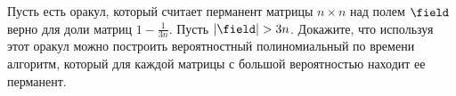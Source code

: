 Пусть есть оракул, который считает перманент матрицы $n \times n$ над полем $\field$ верно для доли
матриц $1 - \frac{1}{3n}$. Пусть $|\field| > 3n$. Докажите, что используя этот оракул можно построить
вероятностный полиномиальный по времени алгоритм, который для каждой матрицы с большой вероятностью
находит ее перманент.
